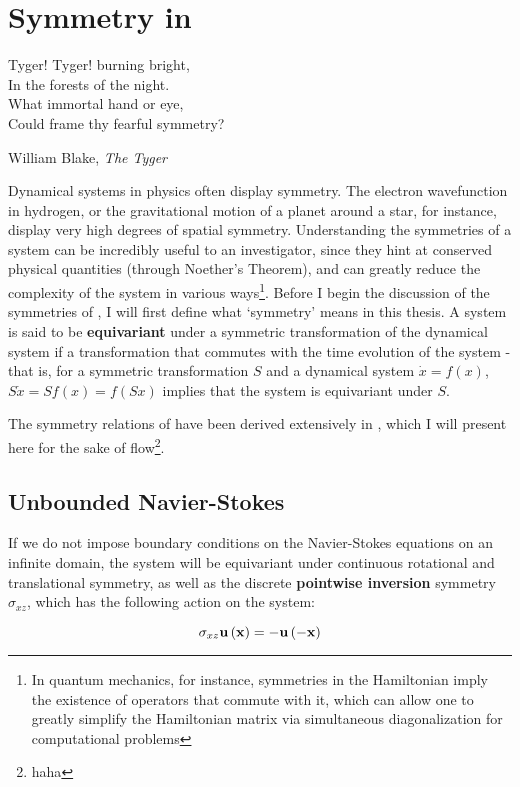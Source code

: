 \chapter{Symmetry in \pCf}	
\epigraph{Tyger! Tyger! burning bright, \\
		In the forests of the night. \\
		What immortal hand or eye,\\
		Could frame thy fearful symmetry?}{William Blake, \emph{The Tyger}} 
Dynamical systems in physics often display symmetry. The electron wavefunction in hydrogen, or the gravitational motion of a planet around a star, for instance, display very high degrees of spatial symmetry.  Understanding the symmetries of a system can be incredibly useful to an investigator, since they hint at conserved physical quantities (through Noether's Theorem), and can greatly reduce the complexity of the system in various ways\footnote{In quantum mechanics, for instance, symmetries in the Hamiltonian imply the existence of operators that commute with it, which can allow one to greatly simplify the Hamiltonian matrix via simultaneous diagonalization for computational problems}. Before I begin the discussion of the symmetries of \pCf, I will first define what `symmetry' means in this thesis. A system is said to be {\bf equivariant} under a symmetric transformation of the dynamical system if a transformation that commutes with the time evolution of the system - that is, for a symmetric transformation $S$ and a dynamical system $\dot{x} = f(x)$, $S \dot{x} = Sf(x) = f(Sx)$ implies that the system is equivariant under $S$.

The symmetry relations of \pCf have been derived extensively in \cite{GIBSON2009}, which I will present here for the sake of flow\footnote{haha}. 
\section{Unbounded Navier-Stokes}

If we do not impose boundary conditions on the Navier-Stokes equations on an infinite domain, the system will be equivariant under continuous rotational and translational symmetry, as well as the discrete {\bf pointwise inversion} symmetry$\sigma_{xz}$, which has the following action on the system:

\begin{equation}\label{eq:pointwiseinversion}
\sigma_{xz}\mathbf{u}\left ( \mathbf{x} \right ) = -\mathbf{u}\left ( -\mathbf{x} \right )
\end{equation}

